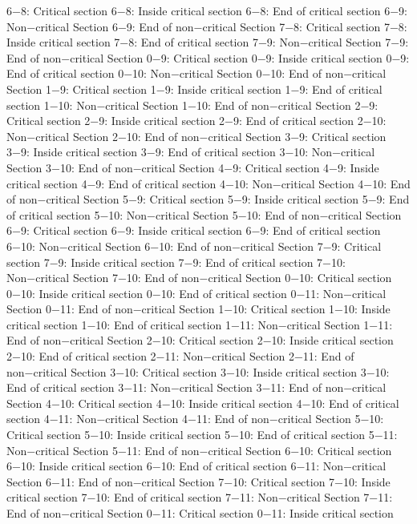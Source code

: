 6−8: Critical section
6−8: Inside critical section
6−8: End of critical section
6−9: Non−critical Section
6−9: End of non−critical Section
7−8: Critical section
7−8: Inside critical section
7−8: End of critical section
7−9: Non−critical Section
7−9: End of non−critical Section
0−9: Critical section
0−9: Inside critical section
0−9: End of critical section
0−10: Non−critical Section
0−10: End of non−critical Section
1−9: Critical section
1−9: Inside critical section
1−9: End of critical section
1−10: Non−critical Section
1−10: End of non−critical Section
2−9: Critical section
2−9: Inside critical section
2−9: End of critical section
2−10: Non−critical Section
2−10: End of non−critical Section
3−9: Critical section
3−9: Inside critical section
3−9: End of critical section
3−10: Non−critical Section
3−10: End of non−critical Section
4−9: Critical section
4−9: Inside critical section
4−9: End of critical section
4−10: Non−critical Section
4−10: End of non−critical Section
5−9: Critical section
5−9: Inside critical section
5−9: End of critical section
5−10: Non−critical Section
5−10: End of non−critical Section
6−9: Critical section
6−9: Inside critical section
6−9: End of critical section
6−10: Non−critical Section
6−10: End of non−critical Section
7−9: Critical section
7−9: Inside critical section
7−9: End of critical section
7−10: Non−critical Section
7−10: End of non−critical Section
0−10: Critical section
0−10: Inside critical section
0−10: End of critical section
0−11: Non−critical Section
0−11: End of non−critical Section
1−10: Critical section
1−10: Inside critical section
1−10: End of critical section
1−11: Non−critical Section
1−11: End of non−critical Section
2−10: Critical section
2−10: Inside critical section
2−10: End of critical section
2−11: Non−critical Section
2−11: End of non−critical Section
3−10: Critical section
3−10: Inside critical section
3−10: End of critical section
3−11: Non−critical Section
3−11: End of non−critical Section
4−10: Critical section
4−10: Inside critical section
4−10: End of critical section
4−11: Non−critical Section
4−11: End of non−critical Section
5−10: Critical section
5−10: Inside critical section
5−10: End of critical section
5−11: Non−critical Section
5−11: End of non−critical Section
6−10: Critical section
6−10: Inside critical section
6−10: End of critical section
6−11: Non−critical Section
6−11: End of non−critical Section
7−10: Critical section
7−10: Inside critical section
7−10: End of critical section
7−11: Non−critical Section
7−11: End of non−critical Section
0−11: Critical section
0−11: Inside critical section
